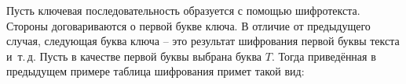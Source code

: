 Пусть ключевая последовательность образуется с помощью шифротекста. Стороны договариваются о первой букве ключа. В отличие от предыдущего случая, следующая буква ключа -- это результат шифрования первой буквы текста и~т.\,д. Пусть в качестве первой буквы выбрана буква $T$. Тогда приведённая в предыдущем примере таблица шифрования примет такой вид:
\begin{center}  \end{center}
\exampleend
